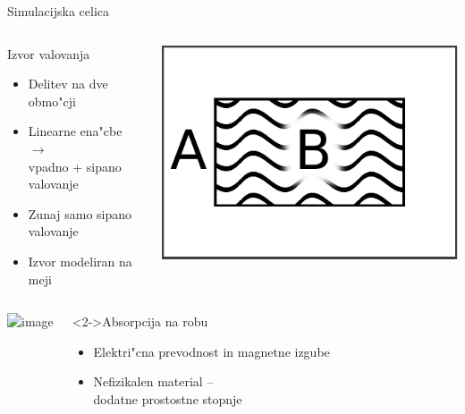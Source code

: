 \documentclass{beamer}
\begin{document}
\begin{frame}{Simulacijska celica}
\begin{columns}
 
 
 \begin{block}{Izvor valovanja}
 \begin{itemize}
  \item Delitev na dve obmo"cji
  \item Linearne ena"cbe $\rightarrow$ \\ vpadno + sipano valovanje
  \item Zunaj samo sipano valovanje
  \item Izvor modeliran na meji
 \end{itemize}
 \end{block}

 \begin{center}
 \includegraphics[width=.8\textwidth]{./Slike/wave-source-regions-one}
 \end{center}
 \end{columns}
 \begin{columns}


 \begin{center}
 \includegraphics<2->[width=.9\textwidth]{./Slike/celica}
 \end{center}


 \begin{block}<2->{Absorpcija na robu}
  \begin{itemize}
   \item Elektri"cna prevodnost in magnetne izgube
   \item Nefizikalen material -- \\ dodatne prostostne stopnje
  \end{itemize}
 \end{block}

\end{columns}
\end{frame}
\end{document}
